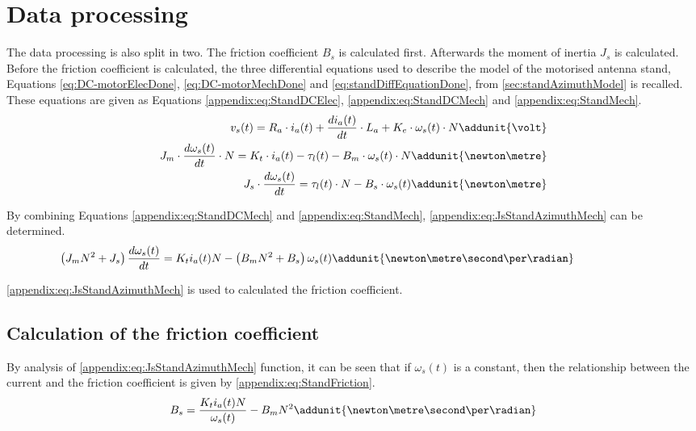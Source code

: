 \section*{Data processing}
The data processing is also split in two. The friction coefficient $B_s$ is calculated first. Afterwards the moment of inertia $J_s$ is calculated. Before the friction coefficient is calculated, the three differential equations used to describe the model of the motorised antenna stand, Equations \ref{eq:DC-motorElecDone}, \ref{eq:DC-motorMechDone} and \ref{eq:standDiffEquationDone}, from \autoref{sec:standAzimuthModel} is recalled. These equations are given as Equations \ref{appendix:eq:StandDCElec}, \ref{appendix:eq:StandDCMech} and \ref{appendix:eq:StandMech}.
\begin{subequations}
	\begin{align}
	v_{s}(t) = R_{a}\cdot i_a(t) + \frac{d i_a(t)}{d t}\cdot L_a + K_{e}\cdot\omega_{s}(t)\cdot N \addunit{\volt} \label{appendix:eq:StandDCElec}\\ 
	J_m \cdot \frac{d \omega_{s}(t)}{d t}\cdot N = K_t\cdot i_a(t)- \tau_l(t) - B_m \cdot \omega_{s}(t)\cdot N \addunit{\newton\metre} \label{appendix:eq:StandDCMech}\\
	J_s \cdot \frac{d \omega_{s}(t)}{d t} =\tau_l(t) \cdot N - B_s \cdot \omega_{s}(t) \addunit{\newton\metre} \label{appendix:eq:StandMech}
	\end{align}
\end{subequations}

By combining Equations \ref{appendix:eq:StandDCMech} and \ref{appendix:eq:StandMech}, \autoref{appendix:eq:JsStandAzimuthMech} can be determined.%
\begin{equation}
\left(J_m N^2 + J_s\right) \frac{d \omega_{s}(t)}{d t} = K_t i_a(t) N - \left(B_m N^2 + B_s \right)\omega_s(t)  \addunit{\newton\metre\second\per\radian} \phantom{KKKKKKK}\label{appendix:eq:JsStandAzimuthMech}
\end{equation}

\autoref{appendix:eq:JsStandAzimuthMech} is used to calculated the friction coefficient.
\subsection*{Calculation of the friction coefficient}
By analysis of \autoref{appendix:eq:JsStandAzimuthMech} function, it can be seen that if $\omega_s(t)$ is a constant, then the relationship between the current and the friction coefficient is given by \autoref{appendix:eq:StandFriction}.
\begin{equation} 
B_s=\frac{ K_t i_a(t) N}{\omega_s(t)}-B_m N^2\addunit{\newton\metre\second\per\radian} \label{appendix:eq:StandFriction}
\end{equation}

